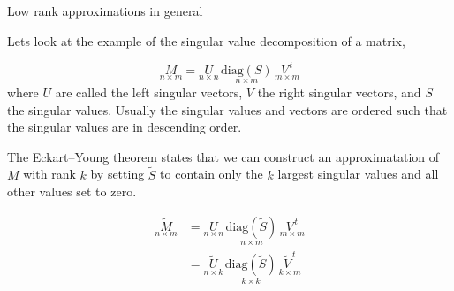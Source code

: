 \documentclass[11pt,ignorenonframetext,]{beamer}
\begin{document}
\begin{frame}{Low rank approximations in general}
\protect\hypertarget{low-rank-approximations-in-general}{}

Lets look at the example of the singular value decomposition of a
matrix,

\[ \underset{n \times m}{M} = \underset{n \times n}{U}\,\underset{n \times m}{\text{diag}(S)}\,\underset{m \times m}{V^{\,t}} \]
where \(U\) are called the left singular vectors, \(V\) the right
singular vectors, and \(S\) the singular values. Usually the singular
values and vectors are ordered such that the singular values are in
descending order.

\pause

The Eckart–Young theorem states that we can construct an approximatation
of \(M\) with rank \(k\) by setting \(\tilde S\) to contain only the
\(k\) largest singular values and all other values set to zero.

\[ 
\begin{aligned}
\underset{n \times m}{\tilde M} 
  &= \underset{n \times n}{U}\,\underset{n \times m}{\text{diag}(\tilde S)}\,\underset{m \times m}{V^{\,t}} \\
  &= \underset{n \times k}{\tilde U}\,\underset{k \times k}{\text{diag}(\tilde S)}\,\underset{k \times m}{\tilde{V}^{\,t}} 
\end{aligned}
\]

\end{frame}
\end{document}
